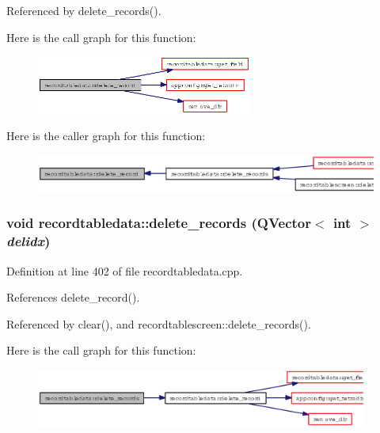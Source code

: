 Referenced by delete\_\-records().

Here is the call graph for this function:\begin{figure}[H]
\begin{center}
\leavevmode
\includegraphics[width=201pt]{classrecordtabledata_79b4a42221e3838aedc8063901fd77a3_cgraph}
\end{center}
\end{figure}


Here is the caller graph for this function:\begin{figure}[H]
\begin{center}
\leavevmode
\includegraphics[width=329pt]{classrecordtabledata_79b4a42221e3838aedc8063901fd77a3_icgraph}
\end{center}
\end{figure}
\subsubsection{\setlength{\rightskip}{0pt plus 5cm}void recordtabledata::delete\_\-records (QVector$<$ int $>$ {\em delidx})}\label{classrecordtabledata_70252d36c2700c65a072d4c1290d2d52}




Definition at line 402 of file recordtabledata.cpp.

References delete\_\-record().

Referenced by clear(), and recordtablescreen::delete\_\-records().

Here is the call graph for this function:\begin{figure}[H]
\begin{center}
\leavevmode
\includegraphics[width=308pt]{classrecordtabledata_70252d36c2700c65a072d4c1290d2d52_cgraph}
\end{center}
\end{figure}


